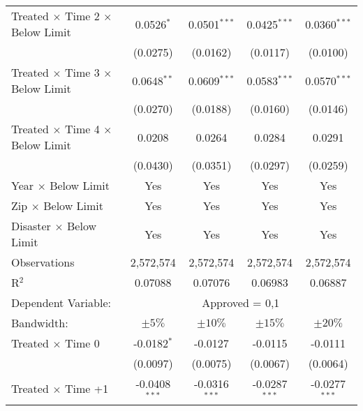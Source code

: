 \begin{tabular*}{0.8\textwidth}{@{\extracolsep{\fill}}lcccc}
   Treated $\times$ Time 2 $\times$ Below Limit      & 0.0526$^{*}$    & 0.0501$^{***}$  & 0.0425$^{***}$  & 0.0360$^{***}$\\   
                                                     & (0.0275)        & (0.0162)        & (0.0117)        & (0.0100)\\   
   Treated $\times$ Time 3 $\times$ Below Limit      & 0.0648$^{**}$   & 0.0609$^{***}$  & 0.0583$^{***}$  & 0.0570$^{***}$\\   
                                                     & (0.0270)        & (0.0188)        & (0.0160)        & (0.0146)\\   
   Treated $\times$ Time 4 $\times$ Below Limit      & 0.0208          & 0.0264          & 0.0284          & 0.0291\\   
                                                     & (0.0430)        & (0.0351)        & (0.0297)        & (0.0259)\\   
   \midrule
   Year $\times$ Below Limit                         & Yes             & Yes             & Yes             & Yes\\  
   Zip $\times$ Below Limit                          & Yes             & Yes             & Yes             & Yes\\  
   Disaster $\times$ Below Limit                     & Yes             & Yes             & Yes             & Yes\\  
   \midrule
   Observations                                        & 2,572,574       & 2,572,574       & 2,572,574       & 2,572,574\\  
   R$^2$                                               & 0.07088         & 0.07076         & 0.06983         & 0.06887\\  
   \midrule
   Dependent Variable: & \multicolumn{4}{c}{Approved = 0,1}\\
   Bandwidth:                                         & $\pm5\%$             & $\pm10\%$           & $\pm15\%$            & $\pm20\%$   \\  
   \midrule 
    Treated $\times$ Time 0                            & -0.0182$^{*}$   & -0.0127         & -0.0115         & -0.0111\\   
                                                      & (0.0097)        & (0.0075)        & (0.0067)        & (0.0064)\\   
    Treated $\times$ Time +1                            & -0.0408$^{***}$ & -0.0316$^{***}$ & -0.0287$^{***}$ & -0.0277$^{***}$\\   

\end{tabular*}
